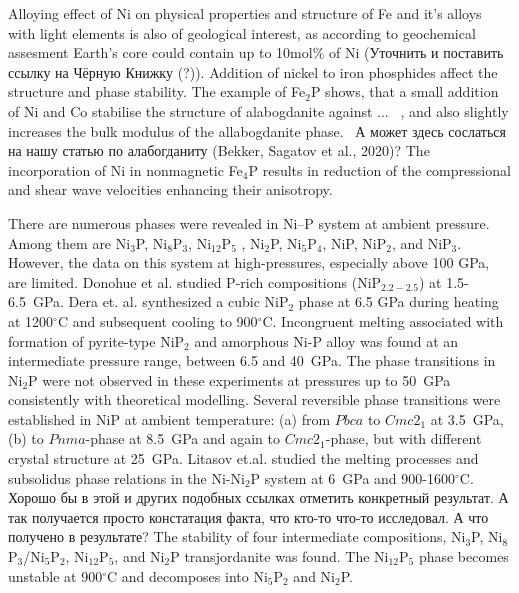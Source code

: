 \documentclass[twoside,twocolumn,9pt]{article}
\begin{document}
Alloying effect of Ni on physical properties and structure of Fe and it's alloys with light elements is also of geological interest, as according to geochemical assesment Earth's core could contain up to 10mol\% of Ni \cite{} (Уточнить и поставить ссылку на Чёрную Книжку (?)).
Addition of nickel to iron phosphides affect the structure and phase stability. 
The example of Fe$_2$P shows, that a small addition of Ni and Co stabilise the structure of alabogdanite against ... ~\cite{Britvin-2002, Buseck1969, Nisar-2010-EPSL}, and also slightly increases the  bulk modulus of the allabogdanite phase.~\cite{Nisar-2010-EPSL} 
А может здесь сослаться на нашу статью по алабогданиту (Bekker, Sagatov et al., 2020)?
The incorporation of Ni in nonmagnetic Fe$_4$P results in reduction of the compressional and shear wave velocities enhancing their anisotropy.\cite{Wu-2011-GRL}

There are numerous phases were revealed in Ni--P system at ambient pressure. 
Among them are Ni$_3$P, Ni$_8$P$_3$, Ni$_{12}$P$_5$ , Ni$_2$P, Ni$_5$P$_4$, NiP, NiP$_2$, and NiP$_3$. 
However, the data on this system at high-pressures, especially above 100 GPa, are limited.
Donohue et al.\cite{Donohue-1968} studied P-rich compositions (NiP$_{2.2-2.5}$) at 1.5-6.5~GPa. 
Dera et. al.\cite{Dera-2009-JGR} synthesized a cubic NiP$_2$ phase at 6.5 GPa during heating at 1200$^\circ$C and subsequent cooling to 900$^\circ$C. 
Incongruent melting associated with formation of pyrite-type NiP$_2$ and amorphous Ni-P alloy was found at an intermediate pressure range, between 6.5 and 40~GPa.
The phase transitions in Ni$_2$P were not observed in these experiments at pressures up to 50~GPa consistently with theoretical modelling.\cite{Nisar-2010-EPSL}
Several reversible phase transitions were established in NiP at ambient temperature: (a) from $Pbca$ to $Cmc2_1$ at 3.5~GPa, (b) to $Pnma$-phase at 8.5~GPa and again to $Cmc2_1$-phase, but with different crystal structure at 25~GPa.\cite{Dera-2011-JSSC, Dera2013-PCM}
Litasov et.al. studied the melting processes and subsolidus phase relations in the Ni-Ni$_2$P system at 6~GPa and 900-1600$^\circ$C.\cite{Litasov-2019-HPR-NiP} 
Хорошо бы в этой и других подобных ссылках отметить конкретный результат. А так получается просто констатация факта, что кто-то что-то исследовал. А что получено в результате?
The stability of four intermediate compositions, Ni$_3$P, Ni$_8$P$_3$/Ni$_5$P$_2$, Ni$_{12}$P$_5$, and Ni$_2$P transjordanite was found. 
The Ni$_{12}$P$_5$ phase becomes unstable at 900$^\circ$C and decomposes into Ni$_5$P$_2$ and Ni$_2$P. 
\end{document}
